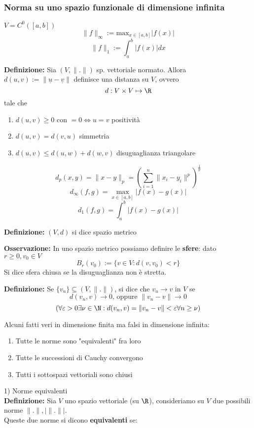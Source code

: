 \subsubsection{Norma su uno spazio funzionale di dimensione infinita}
$V=C^0([a,b])$
\[\|f\|_\infty:=\text{max}_{x\in[a,b]}|f(x)|\]
\[\|f\|_1:=\int_{a}^{b} |f(x)|dx\]
\begin{tcolorbox}	
\textbf{Definizione:} Sia $(V,\|.\|)$ sp. vettoriale normato. Allora $d(u,v):=\|\underline{u}-\underline{v}\|$ definisce una distanza su $V$, ovvero
\[d:V\times V\mapsto \R\]
tale che
\begin{enumerate}
	\item $d(u,v)\ge 0$ con $=0\iff u=v$ positività
	\item $d(u,v)=d(v,u)$ simmetria
	\item $d(u,v)\le d(u,w)+d(w,v)$ disuguaglianza triangolare
\end{enumerate}
\end{tcolorbox}
\[d_p(x,y)=\|x-y\|_p=(\sum_{i=1}^{n} \|x_i-y_i\|^p)^{\frac{1}{p}}\]
\[d_\infty(f,g)=\max_{x\in[a,b]}|f(x)-g(x)|\]
\[d_1(f,g)=\int_{a}^{b} |f(x)-g(x)|\]
\begin{tcolorbox}
	\textbf{Definizione:} $(V,d)$ si dice spazio metrico
\end{tcolorbox}
\textbf{Osservazione:} In uno spazio metrico possiamo definire le \textbf{sfere}: dato $r\ge 0,v_0\in V$
\[B_r(v_0):=\{v\in V:d(v,v_0)<r\} \]
Si dice sfera chiusa se la disuguaglianza non è stretta.\\
\begin{tcolorbox}	
\textbf{Definizione:} Se $\{v_n\} \subseteq  (V,\|.\|)$, si dice che $v_n\to v$ in $V$ se
\[d(v_n,v)\to 0\text{, oppure }\|v_n-v\|\to 0\]
\[(\forall \varepsilon>0\exists \nu\in\N:d(v_n,v)=\|v_n-v\|<\varepsilon\forall n\ge \nu)\]
\end{tcolorbox}
Alcuni fatti veri in dimensione finita ma falsi in dimensione infinita:
\begin{enumerate}
	\item Tutte le norme sono "equivalenti" fra loro
	\item Tutte le successioni di Cauchy convergono
	\item Tutti i sottospazi vettoriali sono chiusi
\end{enumerate}
1) Norme equivalenti\\
\textbf{Definizione:} Sia $V$ uno spazio vettoriale (su $\R$), consideriamo su $V$ due possibili norme $ \|.\|,|\|.\||$.
\\Queste due norme si dicono \textbf{equivalenti} se:
